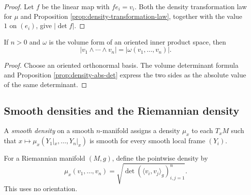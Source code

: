 \begin{proof}

\sketch Let $f$ be the linear map with $fe_i=v_i$. Both the density transformation law for $\mu$ and Proposition \ref{prop:density-transformation-law}, together with the value $1$ on $(e_i)$, give $|\det f|$.
\end{proof}

\begin{proposition}
\label{prop:density-eq-abs-volume-form}





If $n>0$ and $\omega$ is the volume form of an oriented inner product space, then
\[
|v_1\wedge\cdots\wedge v_n|=|\omega(v_1,\ldots,v_n)|.
\]
\end{proposition}

\begin{proof}

\sketch Choose an oriented orthonormal basis. The volume determinant formula and Proposition \ref{prop:density-abs-det} express the two sides as the absolute value of the same determinant.
\end{proof}

\subsection{Smooth densities and the Riemannian density}

\begin{definition}
\label{def:smooth-density}





A \emph{smooth density} on a smooth $n$-manifold assigns a density $\mu_x$ to each $T_xM$ such that $x\mapsto\mu_x(Y_1|_x,\ldots,Y_n|_x)$ is smooth for every smooth local frame $(Y_i)$.
\end{definition}

\begin{definition}
\label{def:riemannian-density-pointwise}





For a Riemannian manifold $(M,g)$, define the pointwise density by
\[
\mu_x(v_1,\ldots,v_n)=\sqrt{\det(\langle v_i,v_j\rangle_g)_{i,j=1}^n}.
\]
This uses no orientation.
\end{definition}


